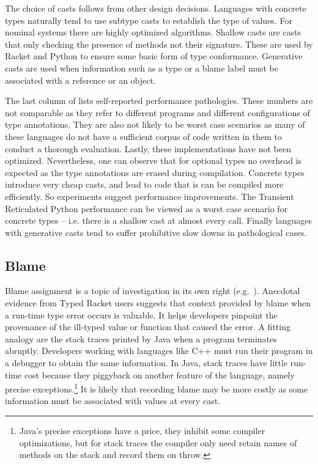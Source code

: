 \documentclass[a4paper,USenglish]{tex/lipics-v2016}
\begin{document}
The choice of casts follows from other design decisions. Languages with
concrete types naturally tend to use subtype casts to establish the type of
values. For nominal systems there are highly optimized algorithms. Shallow
casts are casts that only checking the presence of methods not their
signature. These are used by Racket and Python to ensure some basic form of
type conformance. Generative casts are used when information such as a type
or a blame label must be associated with a reference or an object.

The last column of  lists self-reported performance
pathologies.  These numbers are not comparable as they refer to different
programs and different configurations of type annotations. They are also not
likely to be worst case scenarios as many of these languages do not have a
sufficient corpus of code written in them to conduct a thorough evaluation.
Lastly, these implementations have not been optimized.  Nevertheless, one
can observe that for optional types no overhead is expected as the type
annotations are erased during compilation. Concrete types introduce very
cheap casts, and lead to code that is can be compiled more efficiently. So
experiments suggest performance improvements.  The Transient Reticulated
Python performance can be viewed as a worst case scenario for concrete types
-- i.e. there is a shallow cast at almost every call. Finally languages
with generative casts tend to suffer prohibitive slow downs in pathological 
cases.

\subsection{Blame}
Blame assignment is a topic of investigation in its own right
(e.g.~\cite{Wadler09,SW09,Ahmed09}). Anecdotal evidence from Typed Racket
users suggests that context provided by blame when a run-time type error
occurs is valuable. It helps developers pinpoint the provenance of the
ill-typed value or function that caused the error. A fitting analogy are the
stack traces printed by Java when a program terminates abruptly. Developers
working with languages like C++ must run their program in a debugger to
obtain the same information. In Java, stack traces have little run-time cost
because they piggyback on another feature of the language, namely precise
exceptions.\footnote{ Java's precise exceptions have a price, they inhibit
  some compiler optimizations, but for stack traces the compiler only need
  retain names of methods on the stack and record them on {\sf throw}.} It
is likely that recording blame may be more costly as some information must
be associated with values at every cast.
\end{document}
